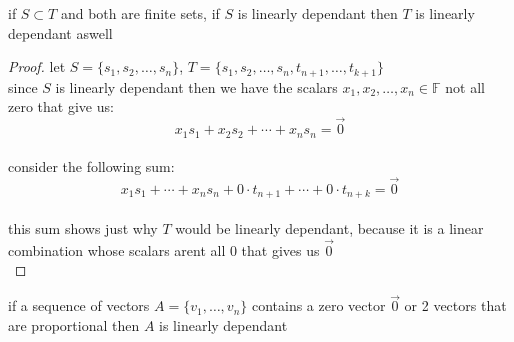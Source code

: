 \documentclass[a4paper,12pt]{article}
\begin{document}
\begin{definition}
\begin{lemma}
if \(S \subset T\) and both are finite sets, if \(S\) is linearly dependant then \(T\) is linearly dependant aswell\\
\begin{proof}
let \(S = \{s_1, s_2, \ldots, s_n\}\), \(T=\{s_1,s_2,\ldots, s_n, t_{n+1}, \ldots, t_{k+1}\}\)\\
since \(S\) is linearly dependant then we have the scalars \(x_1,x_2,\ldots,x_n \in \mathbb{F}\) not all zero that give us:\\
\[
  x_1s_1 + x_2s_2 + \cdots + x_ns_n = \vec0
\]\\
consider the following sum:\\
\[
  x_1s_1 + \cdots + x_ns_n + 0 \cdot t_{n+1} + \cdots + 0 \cdot t_{n+k} = \vec0
\]\\
this sum shows just why \(T\) would be linearly dependant, because it is a linear combination whose scalars arent all 0 that gives us \(\vec0\)\\
\end{proof}
\begin{entailment}
if a sequence of vectors \(A = \{v_1, \ldots, v_n\}\) contains a zero vector \(\vec0\) or 2 vectors that are proportional then \(A\) is linearly dependant\\
\end{entailment}
\end{lemma}


\end{definition}
\end{document}
